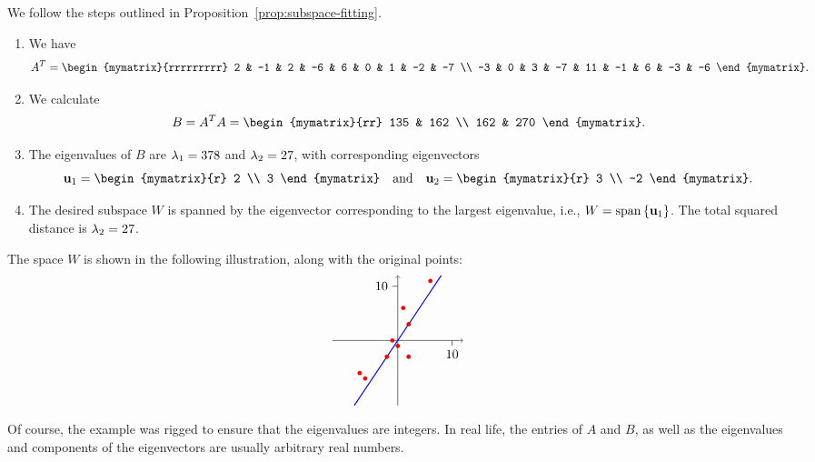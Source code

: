 \begin{solution}
  We follow the steps outlined in
  Proposition~\ref{prop:subspace-fitting}.
  \begin{enumerate}
  \item We have
    \begin{equation*}
      A^T = \begin{mymatrix}{rrrrrrrrr}
        2 & -1 & 2 & -6 & 6 & 0 & 1 & -2 & -7 \\
        -3 & 0 & 3 & -7 & 11 & -1 & 6 & -3 & -6
      \end{mymatrix}.
    \end{equation*}
  \item We calculate
    \begin{equation*}
      B = A^TA = \begin{mymatrix}{rr}
        135 & 162 \\
        162 & 270
      \end{mymatrix}.
    \end{equation*}
  \item The eigenvalues of $B$ are $\lambda_1 = 378$ and
    $\lambda_2 = 27$, with corresponding eigenvectors
    \begin{equation*}
      \vect{u}_1 = \begin{mymatrix}{r} 2 \\ 3 \end{mymatrix}
      \quad\mbox{and}\quad
      \vect{u}_2 = \begin{mymatrix}{r} 3 \\ -2 \end{mymatrix}.
    \end{equation*}
  \item The desired subspace $W$ is spanned by the eigenvector
    corresponding to the largest eigenvalue, i.e.,
    $W=\sspan\set{\vect{u}_1}$. The total squared distance is
    $\lambda_2 = 27$.
  \end{enumerate}
  The space $W$ is shown in the following illustration, along with the
  original points:
  \begin{equation*}
    \begin{tikzpicture}[scale=0.15]
      \draw[thin,->] (-12,0) -- (12,0);
      \draw[thin,->] (0,-12) -- (0,12);
      \draw[thin] (0,10) -- (-1,10) node[left] {$10$};
      \draw[thin] (10,0) -- (10,-1) node[below] {$10$};
      \draw[thick,blue] (-8,-12) -- (8,12);
      \fill[color=red] (2,-3) circle (0.4);
      \fill[color=red] (-1, 0) circle (0.4);
      \fill[color=red] (2, 3) circle (0.4);
      \fill[color=red] (-6, -7) circle (0.4);
      \fill[color=red] (6, 11) circle (0.4);
      \fill[color=red] (0, -1) circle (0.4);
      \fill[color=red] (1, 6) circle (0.4);
      \fill[color=red] (-2, -3) circle (0.4);
      \fill[color=red] (-7, -6) circle (0.4);
    \end{tikzpicture}
  \end{equation*}
  Of course, the example was rigged to ensure that the eigenvalues are
  integers. In real life, the entries of $A$ and $B$, as well as the
  eigenvalues and components of the eigenvectors are usually arbitrary
  real numbers.
\end{solution}

